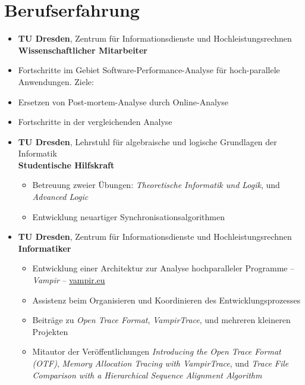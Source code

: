 \section*{Berufserfahrung}
\begin{itemize}
	\item {}
		\textbf{TU Dresden}, Zentrum f\"ur Informationsdienste und Hochleistungsrechnen \\
		\textbf{Wissenschaftlicher Mitarbeiter}
		\item Fortschritte im Gebiet Software-Performance-Analyse f\"ur hoch-parallele Anwendungen. Ziele:
			\item \hspace{1em} Ersetzen von Post-mortem-Analyse durch Online-Analyse
			\item \hspace{1em} Fortschritte in der vergleichenden Analyse
	\item {}
		\textbf{TU Dresden}, Lehrstuhl f\"ur algebraische und logische Grundlagen der Informatik \\
		\textbf{Studentische Hilfskraft}
		\begin{itemize}
			\item Betreuung zweier \"Ubungen: \textit{Theoretische Informatik und Logik}, und \textit{Advanced Logic}
			\item Entwicklung neuartiger Synchronisationsalgorithmen
		\end{itemize}
	\item {}
		\textbf{TU Dresden}, Zentrum f\"ur Informationsdienste und Hochleistungsrechnen \\
		\textbf{Informatiker}
		\begin{itemize}
			\item Entwicklung einer Architektur zur Analyse hochparalleler Programme -- \emph{Vampir} -- \href{http://www.vampir.eu}{vampir.eu}
			\item Assistenz beim Organisieren und Koordinieren des Entwicklungsprozesses
			\item Beitr\"age zu \emph{Open Trace Format}, \emph{VampirTrace}, und mehreren kleineren Projekten
			\item Mitautor der Ver\"offentlichungen \emph{Introducing the Open Trace Format (OTF)}, 
			\emph{Memory Allocation Tracing with VampirTrace}, und \emph{Trace File Comparison with a Hierarchical Sequence Alignment Algorithm}
		\end{itemize}
\end{itemize}

